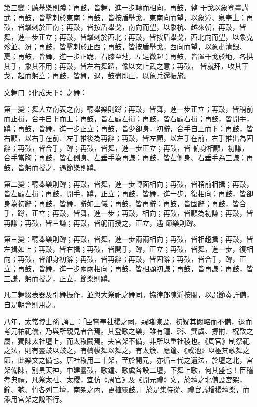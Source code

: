 \begin{pinyinscope}
 第三變：聽舉樂則蹲；再鼓，皆舞，進一步轉而相向，再鼓，整
 干戈以象登臺講武；再鼓，皆擊刺於東南；再鼓，皆按盾舉戈，東南向而望，以象漳、泉奉土；再鼓，皆擊刺於正南；再鼓，皆按盾舉戈，南向而望，以象杭、越來朝，再鼓，皆舞，進一步正立；再鼓，皆擊刺於西北；再鼓，皆按盾舉戈，西北向而望，以象克殄並、汾；再鼓，皆擊刺於正西；再鼓，皆按盾舉戈，西向而望，以象肅清銀、夏；再鼓，皆舞，進一步正跪，右膝至地，左足微起；再鼓，皆置干戈於地，各拱其手，象其不用；再鼓，皆左右舞蹈，像以文止武之意；再鼓，
 皆就拜，收其干戈，起而躬立；再鼓，皆舞，退，鼓盡即止，以象兵還振旅。



 文舞曰《化成天下》之舞：



 第一變：舞人立南表之南，聽舉樂則蹲；再鼓，皆舞，進一步正立；再鼓，皆稍前而正揖，合手自下而上；再鼓，皆左顧左揖；再鼓，皆右顧右揖；再鼓，皆開手，蹲；再鼓，皆舞，進一步正立；再鼓，皆少卻身，初辭，合手自上而下；再鼓，皆右顧，以右手在前、左手推後為再辭；再鼓，皆左顧，以左手在前，右手推出為固辭；再鼓，皆合手，蹲；再鼓，皆舞，進一步正立；再鼓，皆
 俯身相顧，初謙，合手當胸；再鼓，皆右側身、左垂手為再謙；再鼓，皆左側身、右垂手為三謙；再鼓，皆躬而授之，遇節樂則蹲。



 第二變：聽舉樂則蹲；再鼓，皆舞，進一步轉面相向；再鼓，皆稍前相揖；再鼓，皆左顧左揖；再鼓，開手，蹲，正立；再鼓，皆舞，進一步，復相向；再鼓，皆卻身為初辭；再鼓，皆舞，辭如上儀；再鼓，皆再辭；再鼓，皆固辭；再鼓，皆合手，蹲，正立；再鼓，皆舞，進一步；再鼓，相向；再鼓，皆顧為初謙；再鼓，皆再謙；再鼓，皆三謙；再鼓，皆躬而授之，正立，遇
 節樂則蹲。



 第三變：聽舉樂則蹲；再鼓，皆舞，進一步兩兩相向；再鼓，皆相趨揖；再鼓，皆左揖如上；再鼓，皆右揖；再鼓，皆開手，蹲，正立；再鼓，皆舞，進一步，復相向；再鼓，皆卻身初辭；再鼓，皆再辭；再鼓，皆固辭；再鼓，皆合手，蹲，正立；再鼓，皆舞，進一步兩兩相向；再鼓，皆相顧初謙；再鼓，皆再謙；再鼓，皆三謙，躬而授之，正立，節樂則蹲。



 凡二舞綴表器及引舞振作，並與大祭祀之舞同。協律郎陳沂按閱，以謂節奏詳備，自是朝會則用之。



 八年，太常博士孫
 諤言：「臣嘗奉社稷之祠，親睹陳設，初疑其闕略而不備，退而考元祐祀儀，乃與所親見者合焉。其登歌之樂，雖有鐘、磬、簨虡、搏拊、柷敔之屬，獨陳太社壇上，而太稷闕焉。夫宮架不備，非所以重社稷也。《周官》制祭祀之法，則有靈鼓以鼓之，有幬帗舞以舞之，有太簇、應鐘、《咸池》以極其歌舞之節，此樂文之備也。唐社稷用二十架，至於開元，亦循三代之遺法，於壇之北，宮架備陳，別異天神，中建靈鼓，歌鐘、歌虡各設二壇，下舞上歌，何其盛也！臣稽
 考典禮，凡祭太社、太稷，宜仿《周官》及《開元禮》文，於壇之北備設宮架，鐘、匏、竹各列二壇，南架之內，更植靈鼓。」於是集侍從、禮官議增稷壇樂，而添用宮架之說不行。




\end{pinyinscope}
